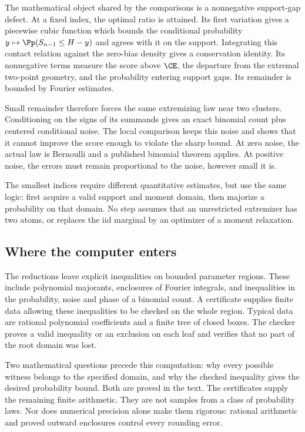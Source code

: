 The mathematical object shared by the comparisons is a nonnegative
support-gap defect. At a fixed index, the optimal ratio is attained.
Its first variation gives a piecewise cubic function which bounds the
conditional probability $y\mapsto\Pp(S_{n-1}\le H-y)$ and agrees
with it on the support. Integrating this contact relation against the
zero-bias density gives a conservation identity. Its nonnegative terms
measure the score above $\CE$, the departure from the extremal
two-point geometry, and the probability entering support gaps. Its
remainder is bounded by Fourier estimates.

Small remainder therefore forces the same extremizing law near two
clusters. Conditioning on the signs of its summands gives an exact
binomial count plus centered conditional noise. The local comparison
keeps this noise and shows that it cannot improve the score enough to
violate the sharp bound. At zero noise, the actual law is Bernoulli and
a published binomial theorem applies. At positive noise, the errors
must remain proportional to the noise, however small it is.

The smallest indices require different quantitative estimates, but
use the same logic: first acquire a valid support and moment domain,
then majorize a probability on that domain. No step assumes that an
unrestricted extremizer has two atoms, or replaces the iid marginal by
an optimizer of a moment relaxation.

\subsection{Where the computer enters}

The reductions leave explicit inequalities on bounded parameter
regions. These include polynomial majorants, enclosures of Fourier
integrals, and inequalities in the probability, noise and phase of a
binomial count. A certificate supplies finite data allowing these
inequalities to be checked on the whole region. Typical data are
rational polynomial coefficients and a finite tree of closed boxes.
The checker proves a valid inequality or an exclusion on each leaf
and verifies that no part of the root domain was lost.

Two mathematical questions precede this computation: why every
possible witness belongs to the specified domain, and why the checked
inequality gives the desired probability bound. Both are proved in
the text. The certificates supply the remaining finite arithmetic.
They are not samples from a class of probability laws. Nor does
numerical precision alone make them rigorous: rational arithmetic and
proved outward enclosures control every rounding error.

